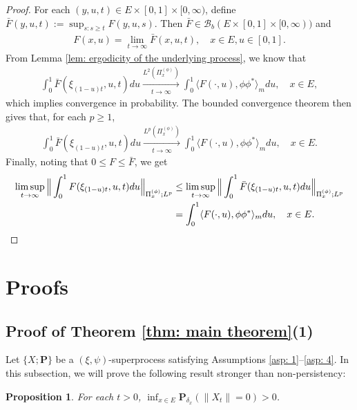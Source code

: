 \documentclass[12pt,a4paper]{amsart}
\newtheorem{prop}[thm]{Proposition}
\theoremstyle{definition}
\numberwithin{equation}{section}
\begin{document}
\begin{proof}
	For each $(y,u,t)\in E\times [0,1]\times [0,\infty)$, define $\bar F(y,u,t) := \sup_{s:s\geq t} F(y,u,s)$.
Then $\bar F\in \mathscr B_b(E\times [0,1]\times [0,\infty))$ and
\begin{align}
	F(x,u)
	= \lim_{t\to \infty} \bar F(x,u,t),
	\quad x\in E, u\in [0,1].
\end{align}
From Lemma \ref{lem: ergodicity of the underlying process}, we know that
\begin{align}
	\int_0^1 \bar F(\xi_{(1-u)t},u,t) du
	\xrightarrow[t\to \infty]{L^2(\Pi_x^{(\phi)})}
	\int_0^1 \langle F(\cdot , u), \phi\phi^*\rangle_m du,
	\quad x\in E,
\end{align}
which implies convergence in probability.
The bounded convergence theorem then gives that, for each $p \geq 1$,
\begin{align}
	\int_0^1 \bar F(\xi_{(1-u)t},u,t) du
	\xrightarrow[t\to \infty]{L^p(\Pi_x^{(\phi)})}
	\int_0^1 \langle F(\cdot , u), \phi\phi^*\rangle_m du,
	\quad x\in E.
\end{align}
Finally, noting that $0\leq F \leq \bar F$, we get
\begin{align}
	\limsup_{ t \to \infty}  \Big\| \int_0^1 F(\xi_{(1-u) t },u,t) du  \Big\|_{\Pi_x^{(\phi)};L^p}
	&\leq \limsup_{ t \to \infty}  \Big\| \int_0^1 \bar F(\xi_{(1-u) t },u,t) du  \Big\|_{\Pi_x^{(\phi)};L^p}
	\\& = \int_0^1 \langle F(\cdot, u), \phi \phi^*\rangle_m du,
	\quad x\in E. \qedhere
\end{align}
\end{proof}

\section{Proofs}
\subsection{Proof of Theorem \ref{thm: main theorem}(1)}
\label{sec: proof of result 1}
Let $\{X; \mathbf P\}$ be a $(\xi, \psi)$-superprocess satisfying
Assumptions \ref{asp: 1}--\ref{asp: 4}.
In this subsection, we will prove the following result stronger than non-persistency:

\begin{prop} \label{prop: non-presistent}
	For each $t > 0$, $\inf_{x\in E} \mathbf P_{\delta_x}(\|X_t\|= 0) > 0$.
\end{prop}
\end{document}
